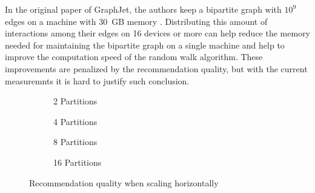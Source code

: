 In the original paper of GraphJet, the authors keep a bipartite graph with $10^9$ edges on a machine with 30~GB memory \cite{sharmaGraphJetRealtimeContent2016}. Distributing this amount of interactions among their edges on 16 devices or more can help reduce the memory needed for maintaining the bipartite graph on a single machine and help to improve the computation speed of the random walk algorithm. These improvements are penalized by the recommendation quality, but with the current measuremnts it is hard to justify such conclusion.


\begin{figure}[!htb]
	\centering
	\begin{subfigure}[b]{0.5\linewidth}
	  \centering
	  
	  \caption{2 Partitions} 
	  \label{fig:horizontal-scaling-2-partitions-a} 
	  \vspace{1cm}
	\end{subfigure}%
	\begin{subfigure}[b]{0.5\linewidth}
	  \centering
	  
	  \caption{4 Partitions} 
	  \label{fig:horizontal-scaling-4-partitions-b} 
	  \vspace{1cm}
	\end{subfigure} 
	\begin{subfigure}[b]{0.5\linewidth}
	  \centering
	  
	  \caption{8 Partitions} 
	  \label{fig:horizontal-scaling-8-partitions-c} 
	\end{subfigure}%
	\begin{subfigure}[b]{0.5\linewidth}
	  \centering
	  
	  \caption{16 Partitions} 
	  \label{fig:horizontal-scaling-16-partitions-d} 
	\end{subfigure} 
	\caption{Recommendation quality when scaling horizontally}
	\label{fig:horizontal-scaling} 
\end{figure}
